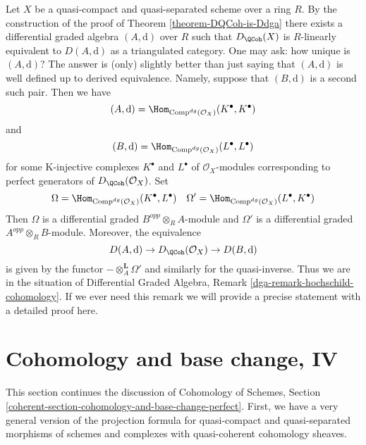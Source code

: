 \begin{remark}
\label{remark-indepedence-choice}
Let $X$ be a quasi-compact and quasi-separated scheme over a ring $R$.
By the construction of the proof of
Theorem \ref{theorem-DQCoh-is-Ddga}
there exists a differential graded algebra $(A, \text{d})$ over $R$
such that $D_\QCoh(X)$ is $R$-linearly equivalent to
$D(A, \text{d})$ as a triangulated category.
One may ask: how unique is $(A, \text{d})$?
The answer is (only) slightly better than just saying that
$(A, \text{d})$ is well defined up to derived equivalence.
Namely, suppose that $(B, \text{d})$ is a second such pair.
Then we have
$$
(A, \text{d}) = \Hom_{\text{Comp}^{dg}(\mathcal{O}_X)}(K^\bullet, K^\bullet)
$$
and
$$
(B, \text{d}) = \Hom_{\text{Comp}^{dg}(\mathcal{O}_X)}(L^\bullet, L^\bullet)
$$
for some K-injective complexes $K^\bullet$ and $L^\bullet$
of $\mathcal{O}_X$-modules corresponding to perfect generators
of $D_\QCoh(\mathcal{O}_X)$. Set
$$
\Omega = \Hom_{\text{Comp}^{dg}(\mathcal{O}_X)}(K^\bullet, L^\bullet)
\quad
\Omega' = \Hom_{\text{Comp}^{dg}(\mathcal{O}_X)}(L^\bullet, K^\bullet)
$$
Then $\Omega$ is a differential graded $B^{opp} \otimes_R A$-module
and $\Omega'$ is a differential graded $A^{opp} \otimes_R B$-module.
Moreover, the equivalence
$$
D(A, \text{d}) \to D_\QCoh(\mathcal{O}_X) \to
D(B, \text{d})
$$
is given by the functor $- \otimes_A^\mathbf{L} \Omega'$ and
similarly for the quasi-inverse. Thus we are in the situation
of Differential Graded Algebra, Remark \ref{dga-remark-hochschild-cohomology}.
If we ever need this remark we will provide a precise statement
with a detailed proof here.
\end{remark}













\section{Cohomology and base change, IV}
\label{section-cohomology-and-base-change-perfect}

\noindent
This section continues the discussion of
Cohomology of Schemes, Section
\ref{coherent-section-cohomology-and-base-change-perfect}.
First, we have a very general version of the projection
formula for quasi-compact and quasi-separated morphisms of schemes 
and complexes with quasi-coherent cohomology sheaves.

